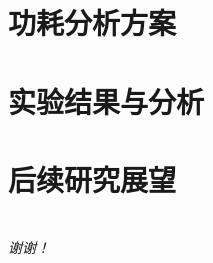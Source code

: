 \documentclass{beamer}
\begin{document}
\section{功耗分析方案}




\section{实验结果与分析}




\section{后续研究展望} %




\section{}
\begin{frame}{}
\centering \huge
\emph{谢谢！}
\end{frame}
\end{document}
